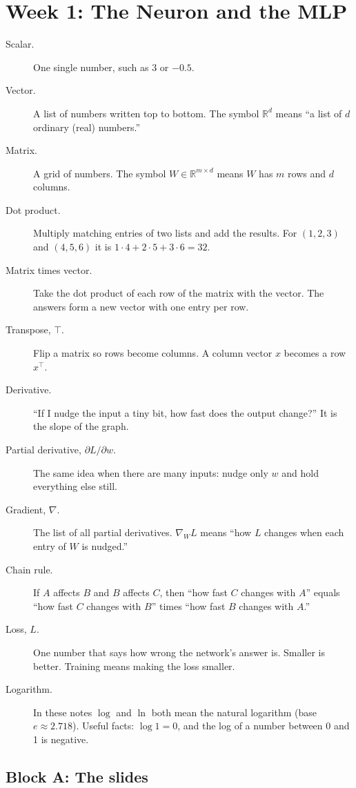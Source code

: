 \section{Week 1: The Neuron and the MLP}

\begin{description}
\item[Scalar.] One single number, such as $3$ or $-0.5$.
\item[Vector.] A list of numbers written top to bottom. The symbol $\mathbb{R}^d$ means ``a list of $d$ ordinary (real) numbers.''
\item[Matrix.] A grid of numbers. The symbol $W \in \mathbb{R}^{m\times d}$ means $W$ has $m$ rows and $d$ columns.
\item[Dot product.] Multiply matching entries of two lists and add the results. For $(1,2,3)$ and $(4,5,6)$ it is $1\cdot4+2\cdot5+3\cdot6 = 32$.
\item[Matrix times vector.] Take the dot product of each row of the matrix with the vector. The answers form a new vector with one entry per row.
\item[Transpose, $\top$.] Flip a matrix so rows become columns. A column vector $x$ becomes a row $x^\top$.
\item[Derivative.] ``If I nudge the input a tiny bit, how fast does the output change?'' It is the slope of the graph.
\item[Partial derivative, $\partial L/\partial w$.] The same idea when there are many inputs: nudge only $w$ and hold everything else still.
\item[Gradient, $\nabla$.] The list of all partial derivatives. $\nabla_W L$ means ``how $L$ changes when each entry of $W$ is nudged.''
\item[Chain rule.] If $A$ affects $B$ and $B$ affects $C$, then ``how fast $C$ changes with $A$'' equals ``how fast $C$ changes with $B$'' times ``how fast $B$ changes with $A$.''
\item[Loss, $L$.] One number that says how wrong the network's answer is. Smaller is better. Training means making the loss smaller.
\item[Logarithm.] In these notes $\log$ and $\ln$ both mean the natural logarithm (base $e \approx 2.718$). Useful facts: $\log 1 = 0$, and the log of a number between 0 and 1 is negative.
\end{description}

\subsection{Block A: The slides}


